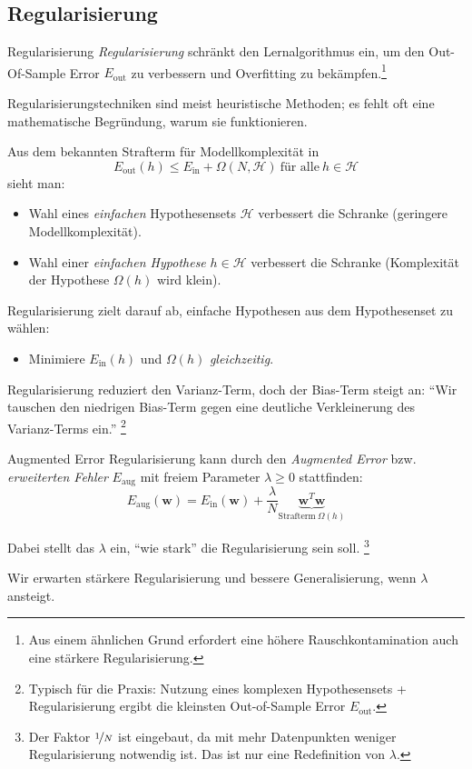 \subsection{Regularisierung}

\begin{defi}{Regularisierung}
    \emph{Regularisierung} schränkt den Lernalgorithmus ein, um den Out-Of-Sample Error $E_\text{out}$ zu verbessern und Overfitting zu bekämpfen.\footnote{Aus einem ähnlichen Grund erfordert eine höhere Rauschkontamination auch eine stärkere Regularisierung.}

    Regularisierungstechniken sind meist heuristische Methoden;
    es fehlt oft eine mathematische Begründung, warum sie funktionieren.

    Aus dem bekannten Strafterm für Modellkomplexität in
    \[
        E_\text{out}(h) \leq E_\text{in} + \Omega(N, \mathcal{H}) \ \text{für alle} \ h \in \mathcal{H}
    \]
    sieht man:
    \begin{itemize}
        \item Wahl eines \emph{einfachen} Hypothesensets $\mathcal{H}$ verbessert die Schranke (geringere Modellkomplexität).
        \item Wahl einer \emph{einfachen Hypothese} $h \in \mathcal{H}$ verbessert die Schranke (Komplexität der Hypothese $\Omega(h)$ wird klein).
    \end{itemize}

    Regularisierung zielt darauf ab, einfache Hypothesen aus dem Hypothesenset zu wählen:
    \begin{itemize}
        \item Minimiere $E_\text{in}(h)$ und $\Omega(h)$ \emph{gleichzeitig}.
    \end{itemize}

    Regularisierung reduziert den Varianz-Term, doch der Bias-Term steigt an:
    \enquote{Wir tauschen den niedrigen Bias-Term gegen eine deutliche Verkleinerung des Varianz-Terms ein.}
    \footnote{Typisch für die Praxis: Nutzung eines komplexen Hypothesensets + Regularisierung ergibt die kleinsten Out-of-Sample Error $E_\text{out}$.}
\end{defi}

\begin{defi}{Augmented Error}
    Regularisierung kann durch den \emph{Augmented Error} bzw. \emph{erweiterten Fehler} $E_\text{aug}$ mit freiem Parameter $\lambda \geq 0$ stattfinden:
    \[
        E_\text{aug}(\mathbf{w}) = E_\text{in}(\mathbf{w}) + \frac{\lambda}{N} \underbrace{\mathbf{w}^T \mathbf{w}}_{\text{Strafterm} \ \Omega(h)}
    \]

    Dabei stellt das $\lambda$ ein, \enquote{wie stark} die Regularisierung sein soll.
    \footnote{
        Der Faktor $\nicefrac{1}{N}$ ist eingebaut, da mit mehr Datenpunkten weniger Regularisierung notwendig ist.
        Das ist nur eine Redefinition von $\lambda$.
    }

    Wir erwarten stärkere Regularisierung und bessere Generalisierung, wenn $\lambda$ ansteigt.
\end{defi}

